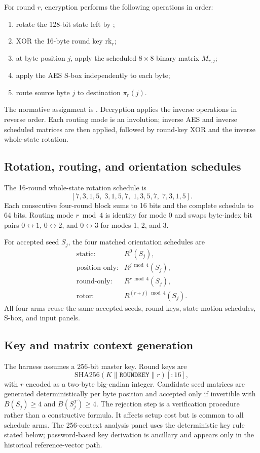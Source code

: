 \documentclass[cryptography,supfile,submit,oneauthor]{Definitions/mdpi}
\begin{document}
For round $r$, encryption performs the following operations in order:
\begin{enumerate}
\item rotate the 128-bit state left by ;
\item XOR the 16-byte round key $\mathrm{rk}_r$;
\item at byte position $j$, apply the scheduled $8\times8$ binary matrix $M_{r,j}$;
\item apply the AES S-box independently to each byte;
\item route source byte $j$ to destination $\pi_r(j)$.
\end{enumerate}
The normative assignment is . Decryption applies the inverse operations in reverse order. Each routing mode is an involution; inverse AES and inverse scheduled matrices are then applied, followed by round-key XOR and the inverse whole-state rotation.

\subsection{Rotation, routing, and orientation schedules}
The 16-round whole-state rotation schedule is
\[
[7,3,1,5,\;3,1,5,7,\;1,3,5,7,\;7,3,1,5].
\]
Each consecutive four-round block sums to 16 bits and the complete schedule to 64 bits. Routing mode $r\bmod4$ is identity for mode 0 and swaps byte-index bit pairs $0\leftrightarrow1$, $0\leftrightarrow2$, and $0\leftrightarrow3$ for modes 1, 2, and 3.

For accepted seed $S_j$, the four matched orientation schedules are
\[
\begin{array}{ll}
\text{static:} & R^0(S_j),\\
\text{position-only:} & R^{j\bmod4}(S_j),\\
\text{round-only:} & R^{r\bmod4}(S_j),\\
\text{rotor:} & R^{(r+j)\bmod4}(S_j).
\end{array}
\]
All four arms reuse the same accepted seeds, round keys, state-motion schedules, S-box, and input panels.

\subsection{Key and matrix context generation}
The harness assumes a 256-bit master key. Round keys are
\[
\mathrm{SHA256}(K\parallel\texttt{ROUNDKEY}\parallel r)[:16],
\]
with $r$ encoded as a two-byte big-endian integer. Candidate seed matrices are generated deterministically per byte position and accepted only if invertible with $B(S_j)\ge4$ and $B(S_j^T)\ge4$. The rejection step is a verification procedure rather than a constructive formula. It affects setup cost but is common to all schedule arms. The 256-context analysis panel uses the deterministic key rule stated below; password-based key derivation is ancillary and appears only in the historical reference-vector path.
\end{document}
